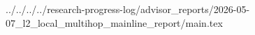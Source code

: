 ../../../../research-progress-log/advisor_reports/2026-05-07_l2_local_multihop_mainline_report/main.tex